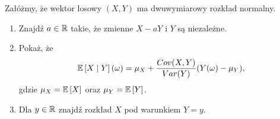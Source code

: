 \begin{problem}
  Załóżmy, że wektor losowy $(X,Y)$ ma dwuwymiarowy rozkład normalny.
  \begin{enumerate}[label=(\alph*)]
    \item Znajdź $a\in\operatorname{\mathbb{R}}$ takie, że zmienne $X-aY$ i $Y$ są niezależne.
    \item Pokaż, że 
      $$\expected{X}{Y}(\omega)=\mu_X+\frac{Cov(X,Y)}{Var(Y)}(Y(\omega)-\mu_Y),$$
      gdzie $\mu_X=\expected{X}$ oraz $\mu_Y=\expected{Y}$.
    \item Dla $y\in\operatorname{\mathbb{R}}$ znajdź rozkład $X$ pod warunkiem $Y=y$.
  \end{enumerate}
\end{problem}
